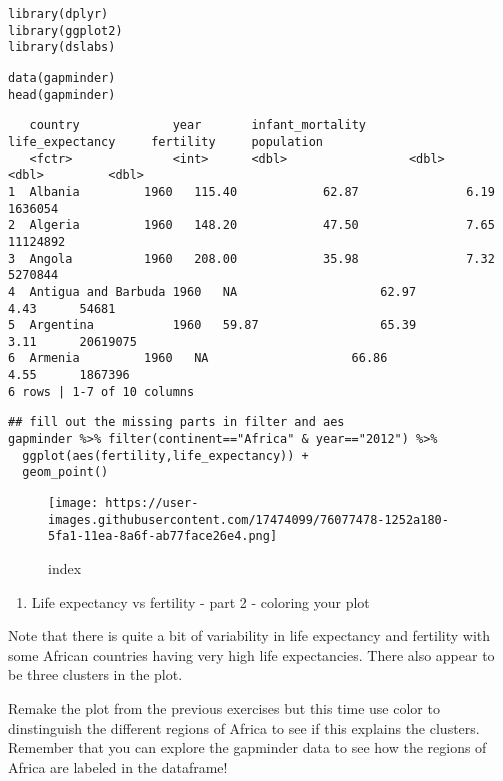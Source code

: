 \documentclass[]{article}
\providecommand{\tightlist}{%
  \setlength{\itemsep}{0pt}\setlength{\parskip}{0pt}}
\begin{document}
\begin{verbatim}
library(dplyr)
library(ggplot2)
library(dslabs)
\end{verbatim}

\begin{verbatim}
data(gapminder)
head(gapminder)
\end{verbatim}

\begin{verbatim}
   country             year       infant_mortality      life_expectancy     fertility     population
   <fctr>              <int>      <dbl>                 <dbl>               <dbl>         <dbl>
1  Albania         1960   115.40            62.87               6.19      1636054   
2  Algeria         1960   148.20            47.50               7.65      11124892  
3  Angola          1960   208.00            35.98               7.32      5270844   
4  Antigua and Barbuda 1960   NA                    62.97               4.43      54681 
5  Argentina           1960   59.87                 65.39               3.11      20619075  
6  Armenia         1960   NA                    66.86               4.55      1867396   
6 rows | 1-7 of 10 columns
\end{verbatim}

\begin{verbatim}
## fill out the missing parts in filter and aes
gapminder %>% filter(continent=="Africa" & year=="2012") %>%
  ggplot(aes(fertility,life_expectancy)) +
  geom_point()
\end{verbatim}

\begin{figure}
\centering
\texttt{[image: https://user-images.githubusercontent.com/17474099/76077478-1252a180-5fa1-11ea-8a6f-ab77face26e4.png]}
\caption{index}
\end{figure}

\begin{enumerate}
\def\labelenumi{\arabic{enumi}.}
\setcounter{enumi}{1}
\tightlist
\item
  Life expectancy vs fertility - part 2 - coloring your plot
\end{enumerate}

Note that there is quite a bit of variability in life expectancy and
fertility with some African countries having very high life
expectancies. There also appear to be three clusters in the plot.

Remake the plot from the previous exercises but this time use color to
dinstinguish the different regions of Africa to see if this explains the
clusters. Remember that you can explore the gapminder data to see how
the regions of Africa are labeled in the dataframe!
\end{document}
